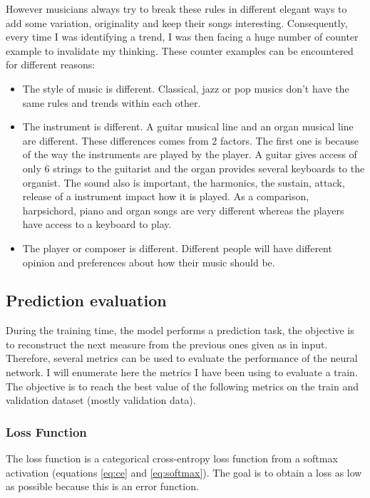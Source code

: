 \documentclass[12pt]{report}
\begin{document}
However musicians always try to break these rules in different elegant ways to add some variation, originality and keep their songs interesting.
Consequently, every time I was identifying a trend, I was then facing a huge number of counter example to invalidate my thinking.
These counter examples can be encountered for different reasons:
\begin{itemize}
    \item The style of music is different.
    Classical, jazz or pop musics don't have the same rules and trends within each other.
    \item The instrument is different.
    A guitar musical line and an organ musical line are different.
    These differences comes from 2 factors.
    The first one is because of the way the instruments are played by the player.
    A guitar gives access of only 6 strings to the guitarist and the organ provides several keyboards to the organist.
    The sound also is important, the harmonics, the sustain, attack, release of a instrument impact how it is played.
    As a comparison, harpsichord, piano and organ songs are very different whereas the players have access to a keyboard to play.
    \item The player or composer is different.
    Different people will have different opinion and preferences about how their music should be.
\end{itemize}

\subsection{Prediction evaluation}

During the training time, the model performs a prediction task, the objective is to reconstruct the next measure from the previous ones given as in input.
Therefore, several metrics can be used to evaluate the performance of the neural network.
I will enumerate here the metrics I have been using to evaluate a train.
The objective is to reach the best value of the following metrics on the train and validation dataset (mostly validation data).

\subsubsection{Loss Function}

The loss function is a categorical cross-entropy loss function from a softmax activation (equations \ref{eq:ce} and \ref{eq:softmax}).
The goal is to obtain a loss as low as possible because this is an error function.
\end{document}
